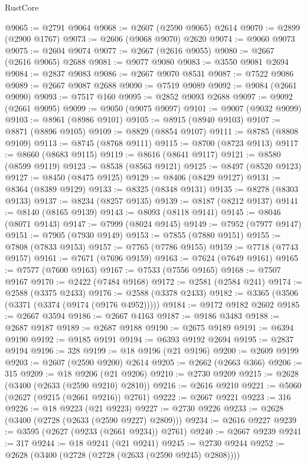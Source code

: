 \begin{lexlean}{RustCore}
\begin{coremodule}
@9065 := @2791 @9064
@9068 := @2607 (@2590 @9065) @2614
@9070 := @2899 (@2900 @1767)
@9073 := @2606 (@9068 @9070) @2620
@9074 := @9060 @9073
@9075 := @2604 @9074
@9077 := @2667 (@2616 @9055)
@9080 := @2667 (@2616 @9065) @2688
@9081 := @9077 @9080
@9083 := @3550 @9081 @2694
@9084 := @2837 @9083
@9086 := @2667 @9070 @8531
@9087 := @7522 @9086
@9089 := @2667 @9087 @2688
@9090 := @7519 @9089
@9092 := @9084 (@2661 @9090)
@9093 := @7517 @160
@9095 := @2852 @9093 @2688
@9097 := @9092 (@2661 @9095)
@9099 := @9050 (@9075 @9097)
@9101 := @9007 (@9032 @9099)
@9103 := @8961 (@8986 @9101)
@9105 := @8915 (@8940 @9103)
@9107 := @8871 (@8896 @9105)
@9109 := @8829 (@8854 @9107)
@9111 := @8785 (@8808 @9109)
@9113 := @8745 (@8768 @9111)
@9115 := @8700 (@8723 @9113)
@9117 := @8660 (@8683 @9115)
@9119 := @8616 (@8641 @9117)
@9121 := @8580 (@8599 @9119)
@9123 := @8538 (@8563 @9121)
@9125 := @8497 (@8520 @9123)
@9127 := @8450 (@8475 @9125)
@9129 := @8406 (@8429 @9127)
@9131 := @8364 (@8389 @9129)
@9133 := @8325 (@8348 @9131)
@9135 := @8278 (@8303 @9133)
@9137 := @8234 (@8257 @9135)
@9139 := @8187 (@8212 @9137)
@9141 := @8140 (@8165 @9139)
@9143 := @8093 (@8118 @9141)
@9145 := @8046 (@8071 @9143)
@9147 := @7999 (@8024 @9145)
@9149 := @7952 (@7977 @9147)
@9151 := @7905 (@7930 @9149)
@9153 := @7855 (@7880 @9151)
@9155 := @7808 (@7833 @9153)
@9157 := @7765 (@7786 @9155)
@9159 := @7718 (@7743 @9157)
@9161 := @7671 (@7696 @9159)
@9163 := @7624 (@7649 @9161)
@9165 := @7577 (@7600 @9163)
@9167 := @7533 (@7556 @9165)
@9168 := @7507 @9167
@9170 := @2422 (@7484 @9168)
@9172 := @2581 (@2584 @241)
@9174 := @2588 (@3375 @2433)
@9176 := @2588 (@3378 @2433)
@9182 := @3365 (@3506 (@3371 (@3374 (@9174 (@9176 @4952)))))
@9184 := @9172 @9182 @2602
@9185 := @2667 @3594
@9186 := @2667 @4163
@9187 := @9186 @3483
@9188 := @2687 @9187
@9189 := @2687 @9188
@9190 := @2675 @9189
@9191 := @6394 @9190
@9192 := @9185 @9191
@9194 := @6393 @9192 @2694
@9195 := @2837 @9194
@9196 := 328
@9199 := @18 @9196 (@21 @9196)
@9200 := @2609 @9199
@9203 := @2607 (@2590 @9200) @2614
@9205 := @2662 (@2663 @366)
@9206 := 315
@9209 := @18 @9206 (@21 @9206)
@9210 := @2730 @9209
@9215 := @2628 (@3400 (@2633 (@2590 @9210) @2810))
@9216 := @2616 @9210
@9221 := @5060 (@2627 (@9215 (@2661 @9216)) @2761)
@9222 := @2667 @9221
@9223 := 316
@9226 := @18 @9223 (@21 @9223)
@9227 := @2730 @9226
@9233 := @2628 (@3400 (@2728 (@2633 (@2590 @9227) @2809)))
@9234 := @2616 @9227
@9239 := @3595 (@2627 (@9233 (@2661 @9234)) @2761)
@9240 := @2667 @9239
@9241 := 317
@9244 := @18 @9241 (@21 @9241)
@9245 := @2730 @9244
@9252 := @2628 (@3400 (@2728 (@2728 (@2633 (@2590 @9245) @2808))))

\end{coremodule}
\end{lexlean}
